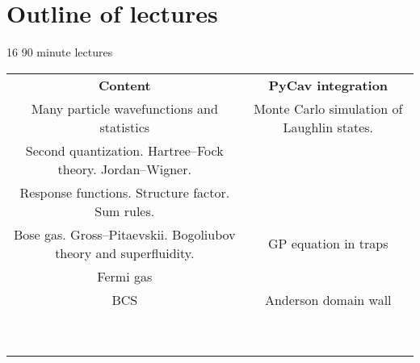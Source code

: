 \section{Outline of lectures}

16 90 minute lectures

\begin{table} 
    \begin{tabular}{ c | c }
     \textbf{Content}   & \textbf{PyCav integration}  \\ 
       Many particle wavefunctions and statistics 
   & Monte Carlo simulation of Laughlin states. \\ 
      Second quantization. Hartree--Fock theory. Jordan--Wigner.  &  \\ 
      Response functions. Structure factor. Sum rules.    &  \\ 
      Bose gas. Gross--Pitaevskii. Bogoliubov theory and superfluidity.   & GP equation in traps \\ 
      Fermi gas   &  \\ 
      BCS   & Anderson domain wall  \\ 
         &  \\ 
         &  \\ 
         &  \\ 
         &  \\ 
         &  \\ 
         &  \\ 
         &  \\ 
         &  \\ 
         &  \\ 
    \end{tabular} 
\end{table}

